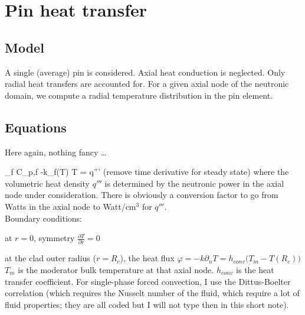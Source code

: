 \documentclass[11pt]{article}
\begin{document}
\section{Pin heat transfer}

\subsection{Model}

A single (average) pin is considered. Axial heat conduction is neglected. Only radial heat transfers are accounted for. For a given axial node of the neutronic domain, we compute a radial temperature distribution in the pin element.
 
\subsection{Equations}
Here again, nothing fancy \ldots

\be
\rho_f C_{p,f}  -\div k_f(T) \grad T = q'''
\ee
(remove time derivative for steady state) where the volumetric heat density $q'''$ is determined by the neutronic power in the axial node under consideration. There is obviously a conversion factor to go from Watts in the axial node to Watt/cm$^3$ for $q'''$.\\

Boundary conditions:
\ben
\item at $r=0$, symmetry $\frac{\partial T}{\partial r} = 0$
\item at the clad outer radius ($r=R_c$), the heat flux $\varphi = -k \partial _n T = h_{conv}\Big(T_m-T(R_c)\Big)$
\een
$T_m$ is the moderator bulk temperature at that axial node. $h_{conv}$ is the heat transfer coefficient. For single-phase forced convection, I use the Dittus-Boelter correlation (which requires the Nusselt number of the fluid, which require a lot of fluid properties; they are all coded but I will not type then in this short note).

\bigskip
\end{document}
